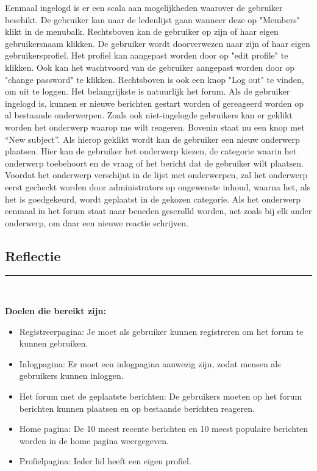 \documentclass[a4paper,12pt]{article}
\newcommand{\HRule}{\rule{\linewidth}{0.5mm}}
\begin{document}
Eenmaal ingelogd is er een scala aan mogelijkheden waarover de gebruiker beschikt. De gebruiker kan naar de ledenlijst gaan wanneer deze op "Members" klikt in de menubalk. Rechtsboven kan de gebruiker op zijn of haar eigen gebruikersnaam klikken. De gebruiker wordt doorverwezen naar zijn of haar eigen gebruikersprofiel. Het profiel kan aangepast worden door op "edit profile" te klikken. Ook kan het wachtvoord van de gebruiker aangepast worden door op "change password" te klikken. Rechtsboven is ook een knop "Log out" te vinden, om uit te loggen. Het belangrijkste is natuurlijk het forum. Als de gebruiker ingelogd is, kunnen er nieuwe berichten gestart worden of gereageerd worden op al bestaande onderwerpen. Zoals ook niet-ingelogde gebruikers kan er geklikt worden het onderwerp waarop me wilt reageren. Bovenin staat nu een knop met “New subject”. Als hierop geklikt wordt kan de gebruiker een nieuw onderwerp plaatsen. Hier kan de gebruiker het onderwerp kiezen, de categorie waarin het onderwerp toebehoort en de vraag of het bericht dat de gebruiker wilt plaatsen. Voordat het onderwerp verschijnt in de lijst met onderwerpen, zal het onderwerp eerst gecheckt worden door administrators op ongewenste inhoud, waarna het, als het is goedgekeurd, wordt geplaatst in de gekozen categorie. Als het onderwerp eenmaal in het forum staat naar beneden gescrolld worden, net zoals bij elk ander onderwerp, om daar een nieuwe reactie schrijven.


\begin{center}
\section[Reflectie]{Reflectie}
\HRule \\[0.5cm]
\end{center}
{\bfseries Doelen die bereikt zijn:}\\
\begin{itemize}
\item Registreerpagina: 
Je moet als gebruiker kunnen registreren om het forum te kunnen gebruiken.
\item Inlogpagina:
Er moet een inlogpagina aanwezig zijn, zodat mensen als gebruikers kunnen inloggen.
\item Het forum met de geplaatste berichten:
De gebruikers moeten op het forum berichten kunnen plaatsen en op bestaande berichten reageren.
\item Home pagina:
De 10 meest recente berichten en 10 meest populaire berichten worden in de home pagina weergegeven.
\item Profielpagina:
Ieder lid heeft een eigen profiel.
\end{itemize}
\end{document}
